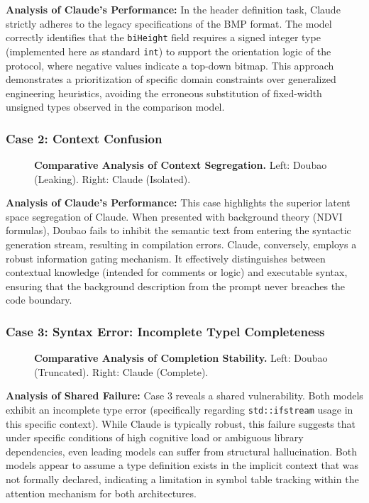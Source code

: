 \documentclass{article}
\theoremstyle{plain}
\theoremstyle{definition}
\theoremstyle{remark}
\begin{document}
\textbf{Analysis of Claude's Performance:}
In the header definition task, Claude strictly adheres to the legacy specifications of the BMP format. The model correctly identifies that the \texttt{biHeight} field requires a signed integer type (implemented here as standard \texttt{int}) to support the orientation logic of the protocol, where negative values indicate a top-down bitmap. This approach demonstrates a prioritization of specific domain constraints over generalized engineering heuristics, avoiding the erroneous substitution of fixed-width unsigned types observed in the comparison model.

\subsubsection{Case 2: Context Confusion}
\begin{figure}[H]
    \centering
    \caption{\textbf{Comparative Analysis of Context Segregation.} Left: Doubao (Leaking). Right: Claude (Isolated).}
    \label{fig:compare_2}
\end{figure}

\textbf{Analysis of Claude's Performance:}
This case highlights the superior latent space segregation of Claude. When presented with background theory (NDVI formulas), Doubao fails to inhibit the semantic text from entering the syntactic generation stream, resulting in compilation errors. Claude, conversely, employs a robust information gating mechanism. It effectively distinguishes between contextual knowledge (intended for comments or logic) and executable syntax, ensuring that the background description from the prompt never breaches the code boundary.

\subsubsection{Case 3: Syntax Error: Incomplete Typel Completeness}
\begin{figure}[H]
    \centering
    \caption{\textbf{Comparative Analysis of Completion Stability.} Left: Doubao (Truncated). Right: Claude (Complete).}
    \label{fig:compare_3}
\end{figure}

\textbf{Analysis of Shared Failure:}
Case 3 reveals a shared vulnerability. Both models exhibit an incomplete type error (specifically regarding \texttt{std::ifstream} usage in this specific context). While Claude is typically robust, this failure suggests that under specific conditions of high cognitive load or ambiguous library dependencies, even leading models can suffer from structural hallucination. Both models appear to assume a type definition exists in the implicit context that was not formally declared, indicating a limitation in symbol table tracking within the attention mechanism for both architectures.
\end{document}
